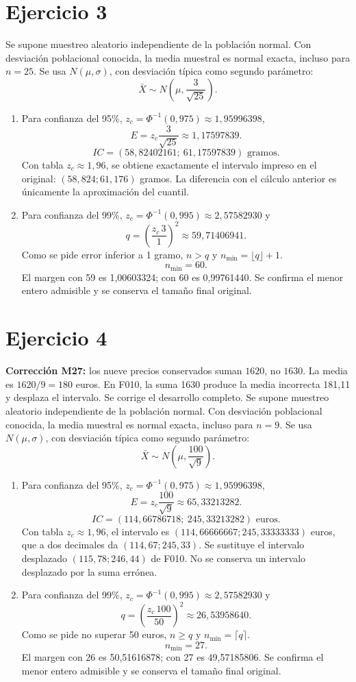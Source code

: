 \documentclass[11pt]{article}
\begin{document}
\section*{Ejercicio 3}
Se supone muestreo aleatorio independiente de la población normal. Con desviación poblacional conocida, la media muestral es normal exacta, incluso para $n=25$. Se usa $N(\mu,\sigma)$, con desviación típica como segundo parámetro:
\[\bar X\sim N\left(\mu,\frac{3}{\sqrt{25}}\right).\]
\begin{enumerate}[label=(\alph*)]\item Para confianza del 95\%, $z_c=\Phi^{-1}(0,975)\approx1,95996398$,
\[E=z_c\frac{3}{\sqrt{25}}\approx1,17597839.\]
\[IC=\boxed{(58,82402161;\ 61,17597839)}\text{ gramos}.\]
Con tabla $z_c\approx1,96$, se obtiene exactamente el intervalo impreso en el original: $(58,824;61,176)$ gramos. La diferencia con el cálculo anterior es únicamente la aproximación del cuantil.
\item Para confianza del 99\%, $z_c=\Phi^{-1}(0,995)\approx2,57582930$ y
\[q=\left(\frac{z_c\,3}{1}\right)^2\approx59,71406941.\]
Como se pide error inferior a 1 gramo, $n>q$ y $n_{\min}=\lfloor q\rfloor+1$.
\[\boxed{n_{\min}=60}.\]
El margen con 59 es 1,00603324; con 60 es 0,99761440. Se confirma el menor entero admisible y se conserva el tamaño final original.
\end{enumerate}
\clearpage
\section*{Ejercicio 4}
\textbf{Corrección M27:} los nueve precios conservados suman $1620$, no $1630$. La media es $1620/9=180$ euros. En F010, la suma 1630 produce la media incorrecta 181,11 y desplaza el intervalo. Se corrige el desarrollo completo.
Se supone muestreo aleatorio independiente de la población normal. Con desviación poblacional conocida, la media muestral es normal exacta, incluso para $n=9$. Se usa $N(\mu,\sigma)$, con desviación típica como segundo parámetro:
\[\bar X\sim N\left(\mu,\frac{100}{\sqrt{9}}\right).\]
\begin{enumerate}[label=(\alph*)]\item Para confianza del 95\%, $z_c=\Phi^{-1}(0,975)\approx1,95996398$,
\[E=z_c\frac{100}{\sqrt{9}}\approx65,33213282.\]
\[IC=\boxed{(114,66786718;\ 245,33213282)}\text{ euros}.\]
Con tabla $z_c\approx1,96$, el intervalo es $(114,66666667;245,33333333)$ euros, que a dos decimales da $(114,67;245,33)$. Se sustituye el intervalo desplazado $(115,78;246,44)$ de F010. No se conserva un intervalo desplazado por la suma errónea.
\item Para confianza del 99\%, $z_c=\Phi^{-1}(0,995)\approx2,57582930$ y
\[q=\left(\frac{z_c\,100}{50}\right)^2\approx26,53958640.\]
Como se pide no superar 50 euros, $n\geq q$ y $n_{\min}=\lceil q\rceil$.
\[\boxed{n_{\min}=27}.\]
El margen con 26 es 50,51616878; con 27 es 49,57185806. Se confirma el menor entero admisible y se conserva el tamaño final original.
\end{enumerate}
\clearpage
\end{document}
